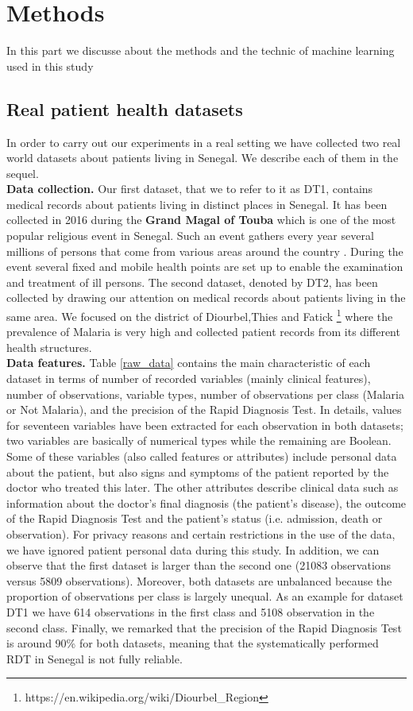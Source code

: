 \section{Methods}\label{Methods}
In this part we discusse about the methods and the technic of machine learning used in this study
\subsection{Real patient health datasets}\label{datasets}
In order to carry out  our experiments in a real setting we have collected two real world datasets about patients living in Senegal. We describe each of them in the sequel.\\
\textbf{Data collection.} Our first dataset, that we  to refer to it as DT1, contains medical records about patients living in distinct places in Senegal. It has been collected in 2016 during the \textbf{Grand Magal of Touba}  which is one of the most popular religious event in Senegal. Such an event gathers every year several millions of persons that come from various areas around the country \cite{Ch17}.  During the event several fixed and mobile health points are set up to enable the examination and treatment of ill persons. The second dataset, denoted by DT2, has been collected by drawing our attention on medical records about patients living in the same area. We focused on the district of Diourbel,Thies and Fatick \footnote{https://en.wikipedia.org/wiki/Diourbel\_Region} where the prevalence of Malaria is very high and collected patient records from its different health structures. \\
\textbf{Data features. } Table \ref{raw_data} contains the main characteristic of each dataset in terms of number of recorded variables (mainly clinical features), number of observations, variable types, number of observations per class (Malaria or Not Malaria), and the precision of the Rapid Diagnosis Test. In details, values for seventeen variables have been extracted for each observation in both datasets; two variables are basically of numerical types while the remaining are Boolean. Some of these variables (also called features or attributes) include personal data about the patient, but also signs and symptoms of the patient reported by the doctor who treated this later. The other attributes describe clinical data such as information about the doctor's final diagnosis (the patient's disease), the outcome of the Rapid Diagnosis Test and the patient's status (i.e. admission, death or observation). For privacy reasons and certain restrictions in the use of the data, we have ignored patient personal data  during this study.
In addition, we can observe that the first dataset is larger than the second one (21083 observations versus 5809 observations). Moreover, both datasets are unbalanced because the proportion of observations per class is largely unequal. As an example for dataset DT1 we have 614 observations in the first class and 5108 observation in the second class. Finally, we remarked that the precision of the Rapid Diagnosis Test is around 90\% for both datasets, meaning that
the systematically performed RDT in Senegal is not fully reliable.

